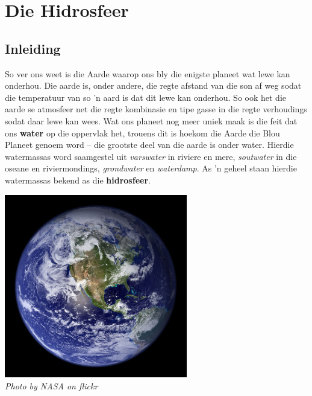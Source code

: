          \chapter{Die Hidrosfeer}

    \section{Inleiding}
            \nopagebreak
\begin{minipage}{.7\textwidth}
So ver ons weet is die Aarde waarop ons bly die enigste planeet wat lewe kan onderhou. Die aarde is, onder andere, die regte afstand van die son af weg sodat die temperatuur van so  'n aard is dat dit lewe kan onderhou. So ook het die aarde se atmosfeer net die regte kombinasie en tipe gasse in die regte verhoudings sodat daar lewe kan wees. Wat ons planeet nog meer uniek maak is die feit dat ons \textbf{water} op die oppervlak het, trouens dit is hoekom die Aarde die Blou Planeet genoem word – die grootste deel van die aarde is onder water. Hierdie watermassas word saamgestel uit \textsl{varswater} in riviere en mere, \textsl{soutwater} in die oseane en riviermondings, \textsl{grondwater} en \textsl{waterdamp}. As  'n geheel staan hierdie watermassas bekend as die \textbf{hidrosfeer}.
\end{minipage}
\begin{minipage}{.3\textwidth}
\begin{center}
 \includegraphics[width=0.6\textwidth]{photos/earth_space_nasa-flickr.jpg}\\
\textsl{Photo by NASA on flickr}
\end{center}

\end{minipage}

